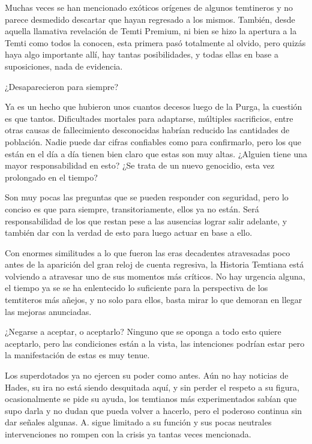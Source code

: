 \documentclass[
  spanish,
]{book}
\begin{document}
Muchas veces se han mencionado exóticos orígenes de algunos temtineros y no parece desmedido descartar que hayan regresado a los mismos. También, desde aquella llamativa revelación de Temti Premium, ni bien se hizo la apertura a la Temti como todos la conocen, esta primera pasó totalmente al olvido, pero quizás haya algo importante allí, hay tantas posibilidades, y todas ellas en base a suposiciones, nada de evidencia.

¿Desaparecieron para siempre?

Ya es un hecho que hubieron unos cuantos decesos luego de la Purga, la cuestión es que tantos. Dificultades mortales para adaptarse, múltiples sacrificios, entre otras causas de fallecimiento desconocidas habrían reducido las cantidades de población. Nadie puede dar cifras confiables como para confirmarlo, pero los que están en el día a día tienen bien claro que estas son muy altas. ¿Alguien tiene una mayor responsabilidad en esto? ¿Se trata de un nuevo genocidio, esta vez prolongado en el tiempo?

Son muy pocas las preguntas que se pueden responder con seguridad, pero lo conciso es que para siempre, transitoriamente, ellos ya no están. Será responsabilidad de los que restan pese a las ausencias lograr salir adelante, y también dar con la verdad de esto para luego actuar en base a ello.

Con enormes similitudes a lo que fueron las eras decadentes atravesadas poco antes de la aparición del gran reloj de cuenta regresiva, la Historia Temtiana está volviendo a atravesar uno de sus momentos más críticos. No hay urgencia alguna, el tiempo ya se se ha enlentecido lo suficiente para la perspectiva de los temtiteros más añejos, y no solo para ellos, basta mirar lo que demoran en llegar las mejoras anunciadas.

¿Negarse a aceptar, o aceptarlo? Ninguno que se oponga a todo esto quiere aceptarlo, pero las condiciones están a la vista, las intenciones podrían estar pero la manifestación de estas es muy tenue.

Los superdotados ya no ejercen su poder como antes. Aún no hay noticias de Hades, su ira no está siendo desquitada aquí, y sin perder el respeto a su figura, ocasionalmente se pide su ayuda, los temtianos más experimentados sabían que supo darla y no dudan que pueda volver a hacerlo, pero el poderoso continua sin dar señales algunas. A. sigue limitado a su función y sus pocas neutrales intervenciones no rompen con la crisis ya tantas veces mencionada.
\end{document}
